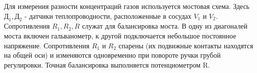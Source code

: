\documentclass[12pt,a4paper]{article}
\begin{document}
\begin{figure}[h!]
\end{figure}

\item Для измерения разности концентраций газов используется мостовая схема.  Здесь $\text{Д}_1,  \text{Д}_2$ - датчики теплопроводности,  расположенные в сосудах $V_1$ и $V_2$.  Сопротивления $R_1,  R_2, R$ служат для  балансировка моста.  В одну из диагоналей моста включен гальванометр,  к другой подключается небольшое постоянное напряжение.  Сопротивления $R_1$ и $R_2$ спарены (их подвижные контакты находятся на общей оси) и изменяются одновременно при повороте ручки грубой регулировки. Точная балансировка выполняется потенциометром R.  
\end{document}
